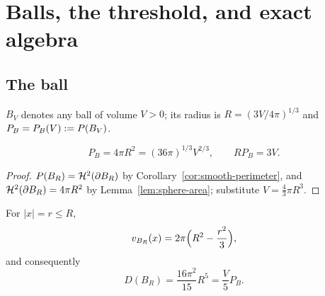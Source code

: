 \chapter{Balls, the threshold, and exact algebra}\label{ch:algebra}

\section{The ball}

\begin{notation}\label{not:BV}
$B_V$ denotes any ball of volume $V>0$; its radius is
$R=(3V/4\pi)^{1/3}$ and $P_B=P_B(V):=P(B_V)$.
\end{notation}

\begin{lemma}\label{lem:ball-perimeter}
\begin{equation}\label{eq:ball-perimeter}
 P_B=4\pi R^2=(36\pi)^{1/3}V^{2/3},\qquad RP_B=3V.
\end{equation}
\end{lemma}

\begin{proof}
$P(B_R)=\mathcal H^2(\partial B_R)$ by
Corollary~\ref{cor:smooth-perimeter}, and
$\mathcal H^2(\partial B_R)=4\pi R^2$ by
Lemma~\ref{lem:sphere-area}; substitute $V=\tfrac43\pi R^3$.
\end{proof}

\begin{lemma}\label{lem:ball-coulomb}
For $|x|=r\le R$,
\begin{equation}\label{eq:ball-potential}
  v_{B_R}(x)=2\pi\Bigl(R^2-\frac{r^2}{3}\Bigr),
\end{equation}
and consequently
\begin{equation}\label{eq:ball-coulomb}
  D(B_R)=\frac{16\pi^2}{15}R^5=\frac V5P_B .
\end{equation}
\end{lemma}

